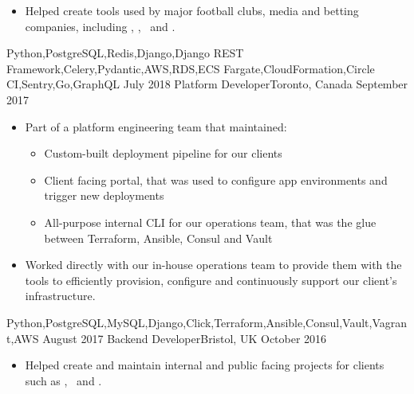 \documentclass[localFont,alternative,10pt]{yaac-another-awesome-cv}
\begin{document}
\begin{experiences}
{\begin{itemize}
\begin{itemize}
                              \item Centralizing log digestion
                            \end{itemize}
                          \item Helped create tools used by major football clubs, media and betting companies, including , , ~and .
                        \end{itemize}
                      }
                      {Python,PostgreSQL,Redis,Django,Django REST Framework,Celery,Pydantic,AWS,RDS,ECS Fargate,CloudFormation,Circle CI,Sentry,Go,GraphQL}
    \emptySeparator
    \experience
      {July 2018}     {Platform Developer}{}{Toronto, Canada}
      {September 2017}{
                        \begin{itemize}
                          \item Part of a platform engineering team that maintained:
                            \begin{itemize}
                              \item Custom-built deployment pipeline for our clients
                              \item Client facing portal, that was used to configure app environments and trigger new deployments
                              \item All-purpose internal CLI for our operations team, that was the glue between Terraform, Ansible, Consul and Vault
                            \end{itemize}
                          \item Worked directly with our in-house operations team to provide them with the tools to efficiently provision, configure and continuously support our client's infrastructure.
                        \end{itemize}
                      }
                      {Python,PostgreSQL,MySQL,Django,Click,Terraform,Ansible,Consul,Vault,Vagrant,AWS}
    \emptySeparator
    \experience
      {August 2017}   {Backend Developer}{}{Bristol, UK}
      {October 2016}  {
                        \begin{itemize}
                          \item Helped create and maintain internal and public facing projects for clients such as , ~and .

\end{itemize}}
\end{experiences}
\end{document}
